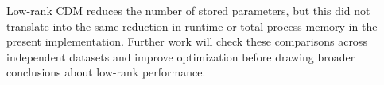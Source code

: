 \documentclass[11pt,a4paper]{article}
\begin{document}
Low-rank CDM reduces the number of stored parameters, but this did not translate into the same reduction in runtime or total process memory in the present implementation. Further work will check these comparisons across independent datasets and improve optimization before drawing broader conclusions about low-rank performance.

\begingroup
\small
\setlength{\bibsep}{3pt}
{}


\endgroup
\end{document}
